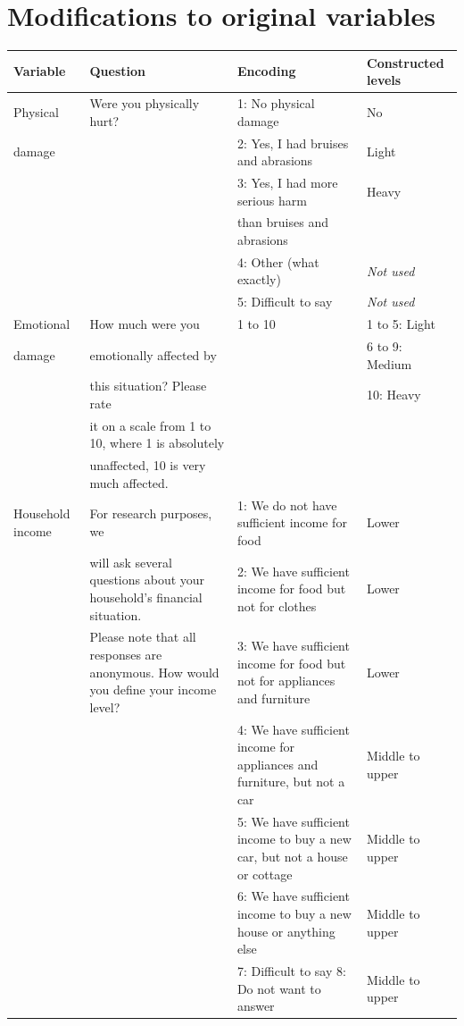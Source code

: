 \documentclass[]{interact}
\theoremstyle{plain}%
\theoremstyle{definition}
\theoremstyle{remark}
\begin{document}
	\section{Modifications to original variables}
	\label{app.table:questions}
	\begingroup\small
	\begin{tabular}{p{2.5cm}p{4cm}p{4cm}l}
	Variable & Question & Encoding & Constructed levels\\
	\midrule
	Physical  & Were you physically hurt? & 1: No physical damage & No\\
	damage & & 2: Yes, I had bruises and abrasions & Light \\
	& & 3: Yes, I had more serious harm & Heavy \\
	& & than bruises and abrasions & \\
	& & 4: Other (what exactly) & \textit{Not used}\\
	& & 5: Difficult to say & \textit{Not used}\\
	\midrule
	Emotional  & How much were you & 1 to 10  & 1 to 5: Light\\
	damage &  emotionally affected by  & &  6 to 9: Medium \\
	&			this situation? Please rate& &  10: Heavy  \\
	&		it  on a scale from 1 to 10, where 1 is absolutely& & \\
	&			unaffected, 10 is very much affected. & & \\
	\midrule
	Household income  &	For research purposes, we & 1: We do not have sufficient income for food & Lower \\  
	 & will ask several questions about your household’s financial situation. &  2: We have sufficient income for food but not for clothes & Lower \\
	 & Please note that all responses are anonymous. How would you define your income level? & 3: We have sufficient income for food but not for appliances and furniture & Lower\\
	 & & 4: We have sufficient income for appliances and furniture, but not a car &Middle to upper\\
	 & & 5: We have sufficient income to buy a new car, but not a house or cottage & Middle to upper \\
	 & & 6: We have sufficient income to buy a new house or anything else & Middle to upper \\
	 & &  7: Difficult to say 8: Do not want to answer & Middle to upper \\
	\end{tabular}
		\endgroup
		
\end{document}
